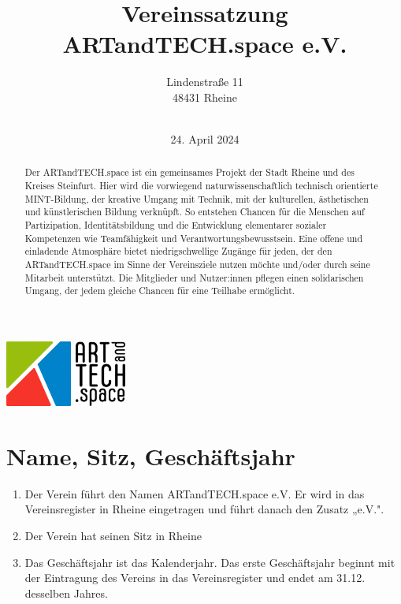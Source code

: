 \documentclass[12pt]{article}
\title{Vereinssatzung \\
ARTandTECH.space e.V.}
\author{
	Lindenstraße 11 \\
	48431 Rheine \\
    \
	}
\date{24. April 2024}
\begin{document}
\maketitle
\thispagestyle{empty}

\begin{center}
	\includegraphics[width=0.3\textwidth]{assets/logo.png}
\end{center}


\thispagestyle{fancy}

\begin{abstract}
	Der ARTandTECH.space ist ein gemeinsames Projekt der Stadt Rheine und des Kreises Steinfurt.
	Hier wird die vorwiegend naturwissenschaftlich technisch orientierte MINT-Bildung, der kreative
	Umgang mit Technik, mit der kulturellen, ästhetischen und künstlerischen Bildung verknüpft. So
	entstehen Chancen für die Menschen auf Partizipation, Identitätsbildung und die Entwicklung
	elementarer sozialer Kompetenzen wie Teamfähigkeit und Verantwortungsbewusstsein.
	Eine offene und einladende Atmosphäre bietet niedrigschwellige Zugänge für jeden, der den
	ARTandTECH.space im Sinne der Vereinsziele nutzen möchte und/oder durch seine Mitarbeit
	unterstützt. Die Mitglieder und Nutzer:innen pflegen einen solidarischen Umgang, der jedem gleiche
	Chancen für eine Teilhabe ermöglicht.
\end{abstract}
\newpage

\pagestyle{fancy}
\fancyhf{}
\tableofcontents
\thispagestyle{fancy}
\newpage

\setcounter{page}{1}

\section{Name, Sitz, Geschäftsjahr}
\begin{enumerate}[label=(\arabic*)]
	\item Der Verein führt den Namen ARTandTECH.space e.V. Er wird in das Vereinsregister in Rheine eingetragen und führt danach den Zusatz „e.V.".
	\item Der Verein hat seinen Sitz in Rheine
	\item Das Geschäftsjahr ist das Kalenderjahr. Das erste Geschäftsjahr beginnt mit der Eintragung des Vereins in das Vereinsregister und endet am 31.12. desselben Jahres.
\end{enumerate}
\end{document}
